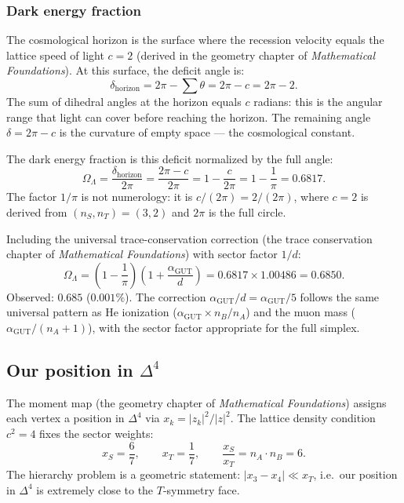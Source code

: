 \documentclass[12pt]{article}
\theoremstyle{remark}
\theoremstyle{definition}
\begin{document}
\subsubsection{Dark energy fraction}

The cosmological horizon is the surface where the recession velocity equals the lattice speed of light $c = 2$ (derived in the geometry chapter of \textit{Mathematical Foundations}). At this surface, the deficit angle is:
\begin{equation}
\delta_\text{horizon} = 2\pi - \sum\theta = 2\pi - c = 2\pi - 2.
\end{equation}
The sum of dihedral angles at the horizon equals $c$ radians: this is the angular range that light can cover before reaching the horizon. The remaining angle $\delta = 2\pi - c$ is the curvature of empty space --- the cosmological constant.

The dark energy fraction is this deficit normalized by the full angle:
\begin{equation}
\boxed{\Omega_\Lambda = \frac{\delta_\text{horizon}}{2\pi} = \frac{2\pi - c}{2\pi} = 1 - \frac{c}{2\pi} = 1 - \frac{1}{\pi} = 0.6817.}
\end{equation}
The factor $1/\pi$ is not numerology: it is $c/(2\pi) = 2/(2\pi)$, where $c = 2$ is derived from $(n_S, n_T) = (3, 2)$ and $2\pi$ is the full circle.

Including the universal trace-conservation correction (the trace conservation chapter of \textit{Mathematical Foundations}) with sector factor $1/d$:
\begin{equation}
\boxed{\Omega_\Lambda = \left(1 - \frac{1}{\pi}\right)\!\left(1 + \frac{\alpha_\mathrm{GUT}}{d}\right) = 0.6817 \times 1.00486 = 0.6850.}
\end{equation}
Observed: $0.685$ ($0.001\%$).  The correction $\alpha_\mathrm{GUT}/d = \alpha_\mathrm{GUT}/5$ follows the same universal pattern as He ionization ($\alpha_\mathrm{GUT} \times n_B/n_A$) and the muon mass ($\alpha_\mathrm{GUT}/(n_A+1)$), with the sector factor appropriate for the full simplex.

\subsection{Our position in $\Delta^4$}
\label{sec:our_position}

The moment map (the geometry chapter of \textit{Mathematical Foundations}) assigns each vertex a position in $\Delta^4$ via $x_k = |z_k|^2/|z|^2$.  The lattice density condition $c^2 = 4$ fixes the sector weights:
\begin{equation}
x_S = \frac{6}{7}, \qquad x_T = \frac{1}{7}, \qquad \frac{x_S}{x_T} = n_A \cdot n_B = 6.
\end{equation}
The hierarchy problem is a geometric statement: $|x_3 - x_4| \ll x_T$, i.e.\ our position in $\Delta^4$ is extremely close to the $T$-symmetry face.
\end{document}
